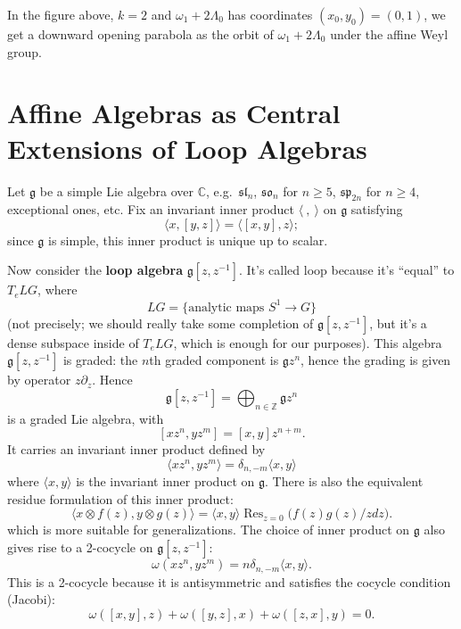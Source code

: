 \documentclass[12pt]{article}
\begin{document}
In the figure above, $k=2$ and $\omega_1 + 2\Lambda_0$ has coordinates $(x_0,y_0) = (0,1)$, we get a downward opening parabola as the orbit of $\omega_1 + 2\Lambda_0$ under the affine Weyl group.


\section{Affine Algebras as Central Extensions of Loop Algebras}
Let $\mathfrak{g}$ be a simple Lie algebra over $\mathbb{C}$, e.g.\ $\mathfrak{sl}_n$, $\mathfrak{so}_n$ for $n \geq 5$, $\mathfrak{sp}_{2n}$ for $n \geq 4$, exceptional ones, etc. Fix an invariant inner product $\langle\ ,\ \rangle$ on $\mathfrak{g}$ satisfying
\[
    \langle x, [y,z]\rangle = \langle [x,y], z\rangle;
\]
since $\mathfrak{g}$ is simple, this inner product is unique up to scalar.

Now consider the \textbf{loop algebra} $\mathfrak{g}[z,z^{-1}]$. It's called loop because it's “equal” to $T_e LG$, where
\[
    LG = \{\text{analytic maps } S^1 \to G\}
\]
(not precisely; we should really take some completion of $\mathfrak{g}[z,z^{-1}]$, but it's a dense subspace inside of $T_e LG$, which is enough for our purposes). This algebra $\mathfrak{g}[z,z^{-1}]$ is graded: the $n$th graded component is $\mathfrak{g} z^n$, hence the grading is given by operator $z\partial_z$. Hence
\[
    \mathfrak{g}[z,z^{-1}] = \bigoplus_{n \in \mathbb{Z}} \mathfrak{g}z^n
\]
is a graded Lie algebra, with
\[
    [xz^n, yz^m] = [x,y] z^{n+m}.
\]
It carries an invariant inner product defined by
\[
    \langle xz^n, yz^m \rangle = \delta_{n,-m} \langle x,y \rangle
\] where $\langle x,y \rangle$ is the invariant inner product on $\mathfrak{g}$. There is also the equivalent residue formulation of this inner product:
\[
    \langle x\otimes f(z), y\otimes g(z) \rangle = \langle x,y \rangle \operatorname{Res}_{z=0}\bigg(f(z)g(z)/z dz\bigg).
\] which is more suitable for generalizations. The choice of inner product on $\mathfrak{g}$ also gives rise to a 2-cocycle on $\mathfrak{g}[z,z^{-1}]$:
\[
    \omega(xz^n, yz^m) = n \delta_{n,-m} \langle x,y \rangle.
\]
This is a 2-cocycle because it is antisymmetric and satisfies the cocycle condition (Jacobi):
\[
    \omega([x,y],z) + \omega([y,z],x) + \omega([z,x],y) = 0.
\]
\end{document}
